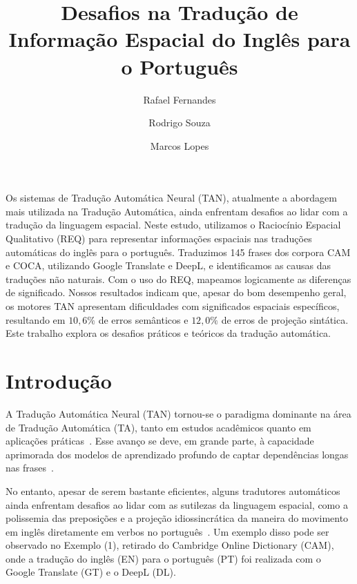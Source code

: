 \documentclass[a4paper, twocolumn, 11pt, twoside]{article}
\title{Desafios na Tradução de Informação Espacial do Inglês para o Português}
\author{
  Rafael Fernandes
  \instituto{Universidade de São Paulo}
  \email{rafael.macario@usp.br} 
  \and 
  Rodrigo Souza
 \instituto{Universidade de São Paulo}
  \email{rodrigo.aparecido.souza@usp.br}
  \and
  Marcos Lopes
  \instituto{Universidade de São Paulo}
  \email{marcoslopes@usp.br}
  \and
}
\begin{document}
\maketitle

\begin{resumo}
Os sistemas de Tradução Automática Neural (TAN), atualmente a abordagem mais utilizada na Tradução Automática, ainda enfrentam desafios ao lidar com a tradução da linguagem espacial. Neste estudo, utilizamos o Raciocínio Espacial Qualitativo (REQ) para representar informações espaciais nas traduções automáticas do inglês para o português. Traduzimos 145 frases dos corpora CAM e COCA, utilizando Google Translate e DeepL, e identificamos as causas das traduções não naturais. Com o uso do REQ, mapeamos logicamente as diferenças de significado. Nossos resultados indicam que, apesar do bom desempenho geral, os motores TAN apresentam dificuldades com significados espaciais específicos, resultando em $10,6\%$ de erros semânticos e $12,0\%$ de erros de projeção sintática. Este trabalho explora os desafios práticos e teóricos da tradução automática.
\end{resumo}



\begin{abstract}
\end{abstract}



\section{Introdução}

A Tradução Automática Neural (TAN) tornou-se o paradigma dominante na área de Tradução Automática (TA), tanto em estudos acadêmicos quanto em aplicações práticas~\citep{dabre2020survey}. Esse avanço se deve, em grande parte, à capacidade aprimorada dos modelos de aprendizado profundo de captar dependências longas nas frases~\citep{vaswani2017attention, yang2020survey}.

No entanto, apesar de serem bastante eficientes, alguns tradutores automáticos ainda enfrentam desafios ao lidar com as sutilezas da linguagem espacial, como a polissemia das preposições e a projeção idiossincrática da maneira do movimento em inglês diretamente em verbos no português~\citep{McCleary-Viotti-2004}. Um exemplo disso pode ser observado no Exemplo (1), retirado do Cambridge Online Dictionary (CAM), onde a tradução do inglês (EN) para o português (PT) foi realizada com o Google Translate (GT) e o DeepL (DL).
\end{document}
